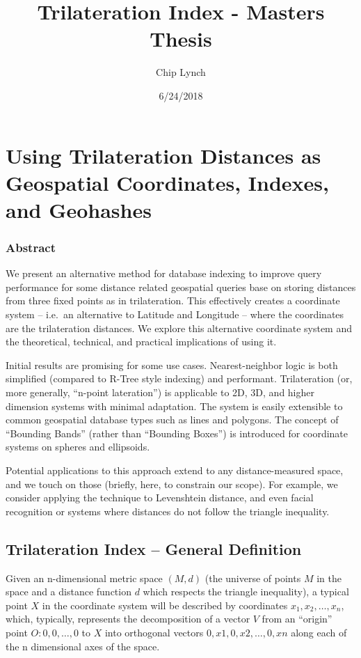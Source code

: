 \documentclass[]{article}
\title{Trilateration Index - Masters Thesis}
\author{Chip Lynch}
\institute{University of Louisville}
\date{6/24/2018}
\begin{document}
\maketitle

\section{Using Trilateration Distances as Geospatial Coordinates,
Indexes, and
Geohashes}\label{using-trilateration-distances-as-geospatial-coordinates-indexes-and-geohashes}

\subsubsection{Abstract}\label{abstract}

We present an alternative method for database indexing to improve query
performance for some distance related geospatial queries base on storing
distances from three fixed points as in trilateration. This effectively
creates a coordinate system -- i.e.~an alternative to Latitude and
Longitude -- where the coordinates are the trilateration distances. We
explore this alternative coordinate system and the theoretical,
technical, and practical implications of using it.

Initial results are promising for some use cases. Nearest-neighbor logic
is both simplified (compared to R-Tree style indexing) and performant.
Trilateration (or, more generally, ``n-point lateration'') is applicable
to 2D, 3D, and higher dimension systems with minimal adaptation. The
system is easily extensible to common geospatial database types such as
lines and polygons. The concept of ``Bounding Bands'' (rather than
``Bounding Boxes'') is introduced for coordinate systems on spheres and
ellipsoids.

Potential applications to this approach extend to any distance-measured
space, and we touch on those (briefly, here, to constrain our scope).
For example, we consider applying the technique to Levenshtein distance,
and even facial recognition or systems where distances do not follow the
triangle inequality.

\newpage

\subsection{Trilateration Index -- General
Definition}\label{trilateration-index-general-definition}

Given an n-dimensional metric space \((M, d)\) (the universe of points
\(M\) in the space and a distance function \(d\) which respects the
triangle inequality), a typical point \(X\) in the coordinate system
will be described by coordinates \({x_1, x_2, …, x_n}\), which,
typically, represents the decomposition of a vector \(V\) from an
``origin'' point \(O: {0, 0, … ,0}\) to \(X\) into orthogonal vectors
\({0,x1}, {0,x2}, …, {0,xn}\) along each of the n dimensional axes of
the space.
\end{document}
